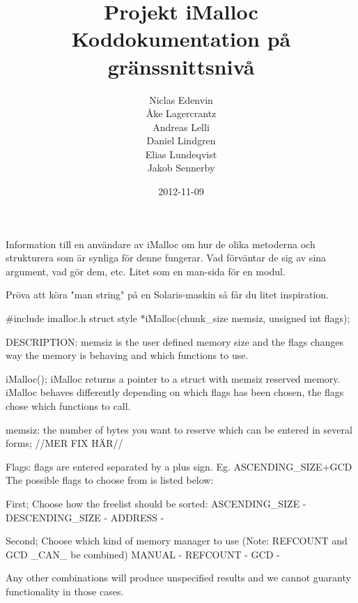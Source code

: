 \documentclass{article}
\title{
  Projekt iMalloc \\
  Koddokumentation på gränssnittsnivå
}
\author{
  Niclas Edenvin \\
  Åke Lagercrantz \\
  Andreas Lelli \\
  Daniel Lindgren \\
  Elias Lundeqvist \\
  Jakob Sennerby
}
\date{2012-11-09}
\begin{document}
\maketitle

\newpage






Information till en användare av iMalloc om hur de olika
metoderna och strukturera som är synliga för denne fungerar.
Vad förväntar de sig av sina argument, vad gör dem, etc. 
Litet som en man-sida för en modul. 

Pröva att köra "man string" på en Solaris-maskin så får du
litet inspiration. 

#include imalloc.h
struct style *iMalloc(chunk_size memsiz, unsigned int flags);

DESCRIPTION: memsiz is the user defined memory size and the flags changes
way the memory is behaving and which functions to use.


iMalloc();
  iMalloc returns a pointer to a struct with memsiz reserved memory. 
  iMalloc behaves differently depending on which flags has been chosen, 
  the flags chose which functions to call.

  memsiz: the number of bytes you want to reserve which can be entered in several forms;
  //MER FIX HÄR//

  Flags: flags are entered separated by a plus sign. Eg. ASCENDING_SIZE+GCD
  The possible flags to choose from is listed below:

  First; Choose how the freelist should be sorted:
  ASCENDING_SIZE - 
  DESCENDING_SIZE -
  ADDRESS - 

  Second; Choose which kind of memory manager to use (Note: REFCOUNT and GCD _CAN_ be combined)
  MANUAL -  
  REFCOUNT - 
  GCD -

  Any other combinations will produce unspecified results and we cannot guaranty functionality
  in those cases.
\end{document}
